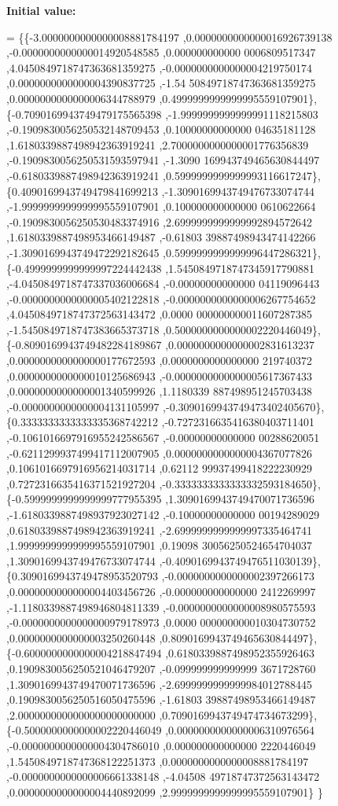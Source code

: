 {\bfseries Initial value\+:}
\begin{DoxyCode}
= \{\{-3.0000000000000008881784197 ,0.0000000000000016926739138 ,-0.0000000000000014920548585 ,0.000000000000
      0006809517347 ,4.0450849718747363681359275 ,-0.0000000000000004219750174 ,0.0000000000000004390837725 ,-1.54
      50849718747363681359275 ,0.0000000000000006344788979 ,0.4999999999999995559107901\},
\{-0.7090169943749479175565398 ,-1.9999999999999991118215803 ,-0.1909830056250532148709453 ,0.10000000000000
      04635181128 ,1.6180339887498942363919241 ,2.7000000000000001776356839 ,-0.1909830056250531593597941 ,-1.3090
      169943749465630844497 ,-0.6180339887498942363919241 ,0.5999999999999993116617247\},
\{0.4090169943749479841699213 ,-1.3090169943749476733074744 ,-1.9999999999999995559107901 ,0.100000000000000
      0610622664 ,-0.1909830056250530483374916 ,2.6999999999999992894572642 ,1.6180339887498953466149487 ,-0.61803
      39887498943474142266 ,-1.3090169943749472292182645 ,0.5999999999999996447286321\},
\{-0.4999999999999997224442438 ,1.5450849718747345917790881 ,-4.0450849718747337036006684 ,-0.00000000000000
      04119096443 ,-0.0000000000000005402122818 ,-0.0000000000000006267754652 ,4.0450849718747372563143472 ,0.0000
      000000000011607287385 ,-1.5450849718747383665373718 ,0.5000000000000002220446049\},
\{-0.8090169943749482284189867 ,0.0000000000000002831613237 ,0.0000000000000000177672593 ,0.0000000000000000
      219740372 ,0.0000000000000010125686943 ,-0.0000000000000005617367433 ,0.0000000000000001340599926 ,1.1180339
      887498951245703438 ,-0.0000000000000004131105997 ,-0.3090169943749473402405670\},
\{0.3333333333333335368742212 ,-0.7272316635416380403711401 ,-0.1061016697916955242586567 ,-0.00000000000000
      00288620051 ,-0.6211299937499417112007905 ,0.0000000000000004367077826 ,0.1061016697916956214031714 ,0.62112
      99937499418222230929 ,0.7272316635416371521927204 ,-0.3333333333333332593184650\},
\{-0.5999999999999999777955395 ,1.3090169943749470071736596 ,-1.6180339887498937923027142 ,-0.10000000000000
      00194289029 ,0.6180339887498942363919241 ,-2.6999999999999997335464741 ,1.9999999999999995559107901 ,0.19098
      30056250524654704037 ,1.3090169943749476733074744 ,-0.4090169943749476511030139\},
\{0.3090169943749478953520793 ,-0.0000000000000002397266173 ,0.0000000000000004403456726 ,-0.000000000000000
      2412269997 ,-1.1180339887498946804811339 ,-0.0000000000000008980575593 ,-0.0000000000000000979178973 ,0.0000
      000000000010304730752 ,0.0000000000000003250260448 ,0.8090169943749465630844497\},
\{-0.6000000000000004218847494 ,0.6180339887498952355926463 ,0.1909830056250521046479207 ,-0.099999999999999
      3671728760 ,1.3090169943749470071736596 ,-2.6999999999999984012788445 ,0.1909830056250516050475596 ,-1.61803
      39887498953466149487 ,2.0000000000000000000000000 ,0.7090169943749474734673299\},
\{-0.5000000000000002220446049 ,0.0000000000000006310976564 ,-0.0000000000000004304786010 ,0.000000000000000
      2220446049 ,1.5450849718747368122251373 ,0.0000000000000008881784197 ,-0.0000000000000006661338148 ,-4.04508
      49718747372563143472 ,0.0000000000000004440892099 ,2.9999999999999995559107901\}
\}
\end{DoxyCode}

